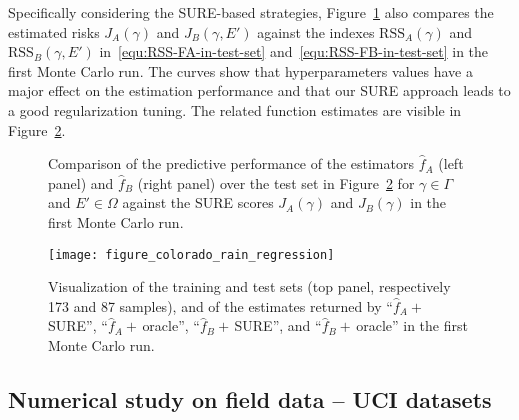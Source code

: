 \documentclass[10pt,twocolumn,twoside]{IEEEtran}					%
\theoremstyle	{plain}
\newcommand	{\Figure}				[0]	{Figure}
\begin{document}
Specifically considering the \ac{SURE}-based strategies, \Figure~\ref{fig:1D_Test_RSS_vs_SURE_risk_FA} also compares the estimated risks $J_{A} \left( \gamma \right)$ and $J_{B} \left( \gamma, E' \right)$ against the indexes $\textrm{RSS}_{A} \left( \gamma \right)$ and $\textrm{RSS}_{B} \left( \gamma, E' \right)$ in~\eqref{equ:RSS-FA-in-test-set} and~\eqref{equ:RSS-FB-in-test-set} in the first Monte Carlo run. The curves show that hyperparameters values have a major effect on the estimation performance and that our \ac{SURE} approach leads to a good regularization tuning. The related function estimates are visible in \Figure~\ref{fig:colorado-rain-regression}.

\begin{figure}[!htbp]
	\centering
	
	\caption{Comparison of the predictive performance of the estimators $\widehat{f}_{A}$ (left panel) and $\widehat{f}_{B}$ (right panel) over the test set in \Figure~\ref{fig:colorado-rain-regression} for $\gamma \in \Gamma$ and $E' \in \Omega$ against the \ac{SURE} scores $J_{A} \left( \gamma \right)$ and $J_{B} \left( \gamma \right)$ in the first Monte Carlo run.}
	\label{fig:1D_Test_RSS_vs_SURE_risk_FA}
\end{figure}

\begin{figure}[!htbp]
	\centering
	\texttt{[image: figure\_colorado\_rain\_regression]}
	\caption{Visualization of the training and test sets (top panel, respectively 173 and 87 samples), and of the estimates returned by ``$\widehat{f}_{A}+\,$SURE'', ``$\widehat{f}_{A}+\,$oracle'', ``$\widehat{f}_{B}+\,$SURE'', and ``$\widehat{f}_{B}+\,$oracle'' in the first Monte Carlo run.}
	\label{fig:colorado-rain-regression}
\end{figure}



\subsection{Numerical study on field data -- UCI datasets}
\label{ssec:numerical_study_on_field_data__cpu_performance}
\end{document}

